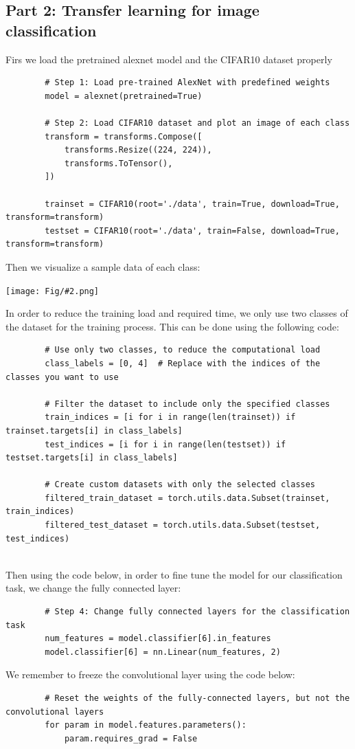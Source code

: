 \documentclass[]{article}
\newcommand{\pict}[2]{\begin{center}
		\texttt{[image: Fig/\#2.png]}
\end{center}}
\begin{document}
	\subsection{Part 2: Transfer learning for image classification}
	Firs we load the pretrained alexnet model and the CIFAR10 dataset properly
	\begin{lstlisting}
		# Step 1: Load pre-trained AlexNet with predefined weights
		model = alexnet(pretrained=True)
		
		# Step 2: Load CIFAR10 dataset and plot an image of each class
		transform = transforms.Compose([
			transforms.Resize((224, 224)),
			transforms.ToTensor(),
		])
		
		trainset = CIFAR10(root='./data', train=True, download=True, transform=transform)
		testset = CIFAR10(root='./data', train=False, download=True, transform=transform)
	\end{lstlisting} 
	Then we visualize a sample data of each class:
	\pict{1}{F9}
	In order to reduce the training load and required time, we only use two classes of the dataset for the training process. This can be done using the following code:
	\begin{lstlisting}
		# Use only two classes, to reduce the computational load
		class_labels = [0, 4]  # Replace with the indices of the classes you want to use
		
		# Filter the dataset to include only the specified classes
		train_indices = [i for i in range(len(trainset)) if trainset.targets[i] in class_labels]
		test_indices = [i for i in range(len(testset)) if testset.targets[i] in class_labels]
		
		# Create custom datasets with only the selected classes
		filtered_train_dataset = torch.utils.data.Subset(trainset, train_indices)
		filtered_test_dataset = torch.utils.data.Subset(testset, test_indices)
		
	\end{lstlisting}
	Then using the code below, in order to fine tune the model for our classification task, we change the fully connected layer:
	\begin{lstlisting}
		# Step 4: Change fully connected layers for the classification task
		num_features = model.classifier[6].in_features
		model.classifier[6] = nn.Linear(num_features, 2)
	\end{lstlisting}
	We remember to freeze the convolutional layer using the code below:
	\begin{lstlisting}
		# Reset the weights of the fully-connected layers, but not the convolutional layers
		for param in model.features.parameters():
			param.requires_grad = False
	\end{lstlisting}
\end{document}
